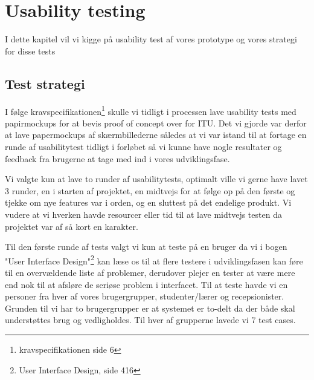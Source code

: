 \chapter{Usability testing}
I dette kapitel vil vi kigge på usability test af vores prototype og vores strategi for disse tests
\section{Test strategi}
I følge kravspecifikationen\footnote{kravspecifikationen side 6} skulle vi tidligt i processen lave usability tests med papirmockups for at bevis proof of concept over for ITU. Det vi gjorde var derfor at lave papermockups af skærmbillederne således at vi var istand til at 
fortage en runde af usabilitytest tidligt i forløbet så vi kunne have nogle resultater og feedback fra brugerne at tage med ind i vores udviklingsfase.

Vi valgte kun at lave to runder af usabilitytests, optimalt ville vi gerne have lavet 3 runder, en i starten af projektet, en midtvejs for at følge op på den første og tjekke om nye features var i orden, og en sluttest på det endelige produkt. Vi vudere at vi hverken havde resourcer eller tid til at lave midtvejs testen da projektet var af så kort en karakter.

Til den første runde af tests valgt vi kun at teste på en bruger da vi i bogen "User Interface Design"\footnote{User Interface Design, side 416} kan læse os til at flere testere i udviklingsfasen kan føre til en overvældende liste af problemer, derudover plejer en tester at være mere end nok til at afsløre de seriøse problem i interfacet.
Til at teste havde vi en personer fra hver af vores brugergrupper, studenter/lærer og recepsionister. Grunden til vi har to brugergrupper er at systemet er to-delt da der både skal understøttes brug og vedligholdes. Til hver af grupperne lavede vi 7 test cases.

